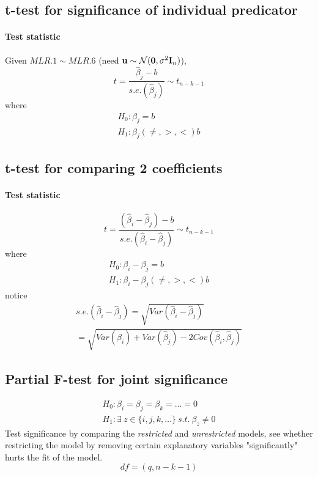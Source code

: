 \documentclass[]{article}
\begin{document}
    	\subsection{t-test for significance of individual predicator}
    		\paragraph{Test statistic} Given $MLR.1 \sim MLR.6$ (need $\textbf{u} \sim \mathcal{{N}}(\textbf{0}, \sigma^2 \textbf{I}_n)$),
    		\[
    			t = \frac{\hat{\beta}_j - b}{s.e.(\hat{\beta}_j)} \sim t_{n-k-1}
    		\]
    		where 
    		\begin{gather*}
    			H_0: \beta_j = b \\
    			H_1: \beta_j (\neq, >, <) b
    		\end{gather*}
    	
    	
    	\subsection{t-test for comparing 2 coefficients}
    	\paragraph{Test statistic}
    	\[
    		t = \frac{(\hat{\beta}_i - \hat{\beta}_j) - b}{s.e.(\hat{\beta}_i - \hat{\beta}_j)} \sim t_{n-k-1}
    	\]
    	where 
    		\begin{gather*}
    			H_0: \beta_i - \beta_j = b \\
    			H_1: \beta_i - \beta_j (\neq, >, <) b
    		\end{gather*}
    	notice
    	\begin{gather*}
    		s.e.(\hat{\beta}_i - \hat{\beta}_j) = \sqrt{Var(\hat{\beta}_i - \hat{\beta}_j)} \\
    		= \sqrt{Var(\hat{\beta}_i) + Var(\hat{\beta}_j) - 2Cov(\hat{\beta}_i, \hat{\beta}_j)}
    	\end{gather*}
    	
    	\subsection{Partial F-test for joint significance}
    	\begin{gather*}
    		H_0: \beta_i = \beta_j = \beta_k = \dots = 0 \\
    		H_1: \exists\ z \in \{i, j, k, \dots \}\ s.t.\ \beta_z \neq 0
    	\end{gather*}
    	Test significance by comparing the \emph{restricted} and \emph{unrestricted} models, see whether restricting the model by removing certain explanatory variables "significantly" hurts the fit of the model.
    	\[
    		df = (q, n-k-1)
    	\]
\end{document}
